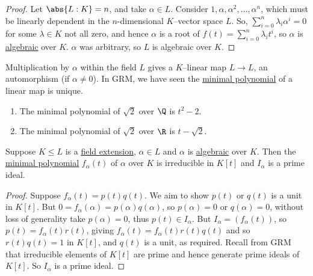 \documentclass{article}
\begin{document}
\begin{proof}
    Let $\abs{L:K}=n$, and take $\alpha \in L$. Consider $1, \alpha, \alpha^2, \dotsc, \alpha^n$, which must be linearly dependent in the $n$-dimensional $K$--vector space $L$.
    So, $\sum_{i=0}^n \lambda_i \alpha^i = 0$ for some $\lambda \in K$ not all zero, and hence $\alpha$ is a root of $f(t) = \sum_{i=0}^n \lambda_i t^i$, so $\alpha$ is \hyperlink{def:algebraic}{algebraic} over $K$.
    $\alpha$ was arbitrary, so $L$ is algebraic over $K$.
\end{proof}


\begin{remark}
    Multiplication by $\alpha$ within the field $L$ gives a $K$--linear map $L \to L$, an automorphism (if $\alpha \ne 0$).  In GRM, we have seen the \hyperlink{def:minimalPoly}{minimal polynomial} of a linear map is unique.
\end{remark}

\begin{eg}\leavevmode
    \begin{enumerate}[label=(\roman*)]
        \item The minimal polynomial of $\sqrt{2}$ over $\Q$ is $t^2 - 2$.
        \item The minimal polynomial of $\sqrt{2}$ over $\R$ is $t - \sqrt{2}$.
    \end{enumerate}
\end{eg}

\begin{nlemma}\label{lem:1.7}
    Suppose $K \leq L$ is a \hyperlink{def:fieldExt}{field extension}, $\alpha \in L$ and $\alpha$ is \hyperlink{def:algebraic}{algebraic} over $K$.
    Then the \hyperlink{def:minimalPoly}{minimal polynomial} $f_\alpha(t)$ of $\alpha$ over $K$ is irreducible in $K[t]$ and $I_\alpha$ is a prime ideal.
\end{nlemma}

\begin{proof}
    Suppose $f_\alpha(t) = p(t) q(t)$. We aim to show $p(t)$ or $q(t)$ is a unit in $K[t]$.
    But $0 = f_\alpha(\alpha) = p(\alpha) q(\alpha)$, so $p(\alpha) = 0$ or $q(\alpha) = 0$, without loss of generality take $p(\alpha) = 0$, thus $p(t) \in I_\alpha$.
    But $I_\alpha=(f_\alpha(t))$, so $p(t) = f_\alpha(t) r(t)$, giving $f_\alpha(t) = f_\alpha(t) r(t) q(t)$ and so $r(t) q(t) = 1$ in $K[t]$, and $q(t)$ is a unit, as required.
    Recall from GRM that irreducible elements of $K[t]$ are prime and hence generate prime ideals of $K[t]$. So $I_\alpha$ is a prime ideal.
\end{proof}
\end{document}
